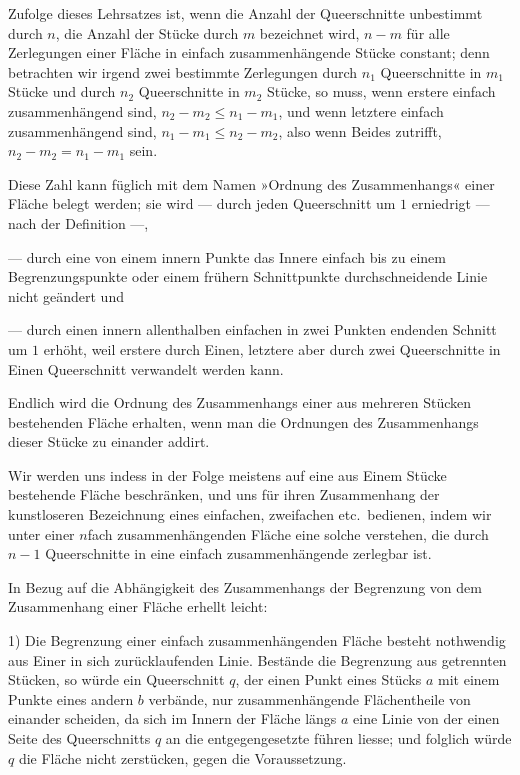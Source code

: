 \documentclass{article}
\begin{document}
Zufolge dieses Lehrsatzes ist, wenn die Anzahl der Queerschnitte unbestimmt durch $n$, die Anzahl der Stücke durch $m$ bezeichnet wird, $n - m$ für alle Zerlegungen einer Fläche in einfach zusammenhängende Stücke constant; denn betrachten wir irgend zwei bestimmte Zerlegungen durch $n_1$ Queerschnitte in $m_1$ Stücke und durch $n_2$ Queerschnitte in $m_2$ Stücke, so muss, wenn erstere einfach zusammenhängend sind, $n_2 - m_2 \le n_1 - m_1$, und wenn letztere einfach zusammenhängend sind, $n_1 - m_1 \le n_2 - m_2$, also wenn Beides zutrifft, $n_2 - m_2 = n_1 - m_1$ sein.

Diese Zahl kann füglich mit dem Namen »Ordnung des Zusammenhangs« einer Fläche belegt werden; sie wird
--- durch jeden Queerschnitt um $1$ erniedrigt --- nach der Definition ---,


--- durch eine von einem innern Punkte das Innere einfach bis zu einem Begrenzungspunkte oder einem frühern Schnittpunkte durchschneidende Linie nicht geändert und


--- durch einen innern allenthalben einfachen in zwei Punkten endenden Schnitt um $1$ erhöht,
weil erstere durch Einen, letztere aber durch zwei Queerschnitte in Einen Queerschnitt verwandelt werden kann.

Endlich wird die Ordnung des Zusammenhangs einer aus mehreren Stücken bestehenden Fläche erhalten, wenn man die Ordnungen des Zusammenhangs dieser Stücke zu einander addirt.

Wir werden uns indess in der Folge meistens auf eine aus Einem Stücke bestehende Fläche beschränken, und uns für ihren Zusammenhang der kunstloseren Bezeichnung eines einfachen, zweifachen etc.\ bedienen, indem wir unter einer $n$fach zusammenhängenden Fläche eine solche verstehen, die durch $n-1$ Queerschnitte in eine einfach zusammenhängende zerlegbar ist.

In Bezug auf die Abhängigkeit des Zusammenhangs der Begrenzung von dem Zusammenhang einer Fläche erhellt leicht:

1) Die Begrenzung einer einfach zusammenhängenden Fläche besteht nothwendig aus Einer in sich zurücklaufenden Linie.
Bestände die Begrenzung aus getrennten Stücken, so würde ein Queerschnitt $q$, der einen Punkt eines Stücks $a$ mit einem Punkte eines andern $b$ verbände, nur zusammenhängende Flächentheile von einander scheiden, da sich im Innern der Fläche längs $a$ eine Linie von der einen Seite des Queerschnitts $q$ an die entgegengesetzte führen liesse; und folglich würde $q$ die Fläche nicht zerstücken, gegen die Voraussetzung.
\end{document}
